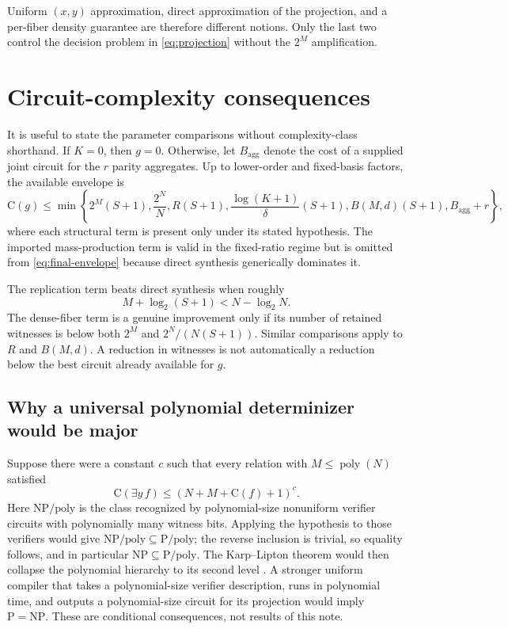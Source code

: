 \documentclass[11pt]{article}
\theoremstyle{definition}
\theoremstyle{remark}
\newcommand{\C}{\mathrm C}
\newcommand{\poly}{\operatorname{poly}}
\begin{document}
Uniform $(x,y)$ approximation, direct approximation of the projection, and a
per-fiber density guarantee are therefore different notions.  Only the last
two control the decision problem in \eqref{eq:projection} without the
$2^M$ amplification.

\section{Circuit-complexity consequences}
\label{sec:consequences}

It is useful to state the parameter comparisons without complexity-class
shorthand.  If $K=0$, then $g=0$.  Otherwise, let $B_{\mathrm{agg}}$ denote
the cost of a supplied joint circuit for the $r$ parity aggregates.  Up to
lower-order and fixed-basis factors, the available envelope is
\[
\C(g)\le\min\left\{
  2^M(S+1),
  \frac{2^N}{N},
  R(S+1),
  \frac{\log(K+1)}{\delta}(S+1),
  B(M,d)(S+1),
  B_{\mathrm{agg}}+r
\right\},
\tag{8.1}\label{eq:final-envelope}
\]
where each structural term is present only under its stated hypothesis.  The
imported mass-production term is valid in the fixed-ratio regime but is
omitted from \eqref{eq:final-envelope} because direct synthesis generically
dominates it.

The replication term beats direct synthesis when roughly
\[
  M+\log_2(S+1)<N-\log_2N.
  \tag{8.2}\label{eq:replication-threshold}
\]
The dense-fiber term is a genuine improvement only if its number of retained
witnesses is below both $2^M$ and $2^N/(N(S+1))$.  Similar comparisons apply
to $R$ and $B(M,d)$.  A reduction in witnesses is not automatically a
reduction below the best circuit already available for $g$.

\subsection{Why a universal polynomial determinizer would be major}

Suppose there were a constant $c$ such that every relation with
$M\le\poly(N)$ satisfied
\[
  \C(\exists y\,f)\le(N+M+\C(f)+1)^c.
  \tag{8.3}\label{eq:hypothetical-determinizer}
\]
Here $\mathrm{NP/poly}$ is the class recognized by polynomial-size
nonuniform verifier circuits with polynomially many witness bits.  Applying
the hypothesis to those verifiers would give
$\mathrm{NP/poly}\subseteq\mathrm{P/poly}$; the reverse inclusion is trivial,
so equality follows, and in particular
$\mathrm{NP}\subseteq\mathrm{P/poly}$.  The Karp--Lipton theorem would then
collapse the polynomial hierarchy to its second level
\cite{KarpLipton1980}.  A stronger uniform compiler that takes a
polynomial-size verifier description, runs in polynomial time, and outputs a
polynomial-size circuit for its projection would imply
$\mathrm P=\mathrm{NP}$.  These are conditional consequences, not results of
this note.
\end{document}
